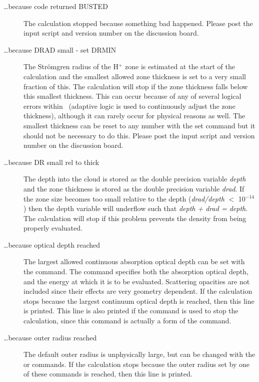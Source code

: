 \begin{description}
\item[\dots because code returned BUSTED]  The calculation stopped because
something bad happened.  Please post the input script and version number
on the discussion board.

\item[\dots because DRAD small -  set DRMIN]  The Str\"omgren radius of the
H$^+$
zone is estimated at the start of the calculation and the smallest allowed
zone thickness is set to a very small fraction of this.  The calculation
will stop if the zone thickness falls below this smallest thickness.  This
can occur because of any of several logical errors within \Cloudy\ (adaptive
logic is used to continuously adjust the zone thickness), although it can
rarely occur for physical reasons as well.  The smallest thickness can be
reset to any number with the set  command but it should not be necessary
to do this.  Please post the input script and version number on the
discussion board.

\item[\dots because DR small rel to thick]  The depth into the cloud is stored
as the double precision variable \emph{depth} and the zone thickness is stored
as the double precision variable \emph{drad}.  If the zone size becomes too small
relative to the depth (\emph{drad/depth} $<$ 10$^{-14}$) then the depth variable will
underflow such that \emph{depth + drad = depth}.  The calculation will stop if
this problem prevents the density from being properly evaluated.

\item[\dots because optical depth reached]  The largest allowed continuous
absorption optical depth can be set with the  command.
The command specifies both the absorption optical depth, and the energy
at which it is to be evaluated.  Scattering opacities are not included since
their effects are very geometry dependent.  If the calculation stops because
the largest continuum optical depth is reached, then this line is printed.
This line is also printed if the  command is
used to stop the calculation, since this command is actually a form of the
 command.

\item[\dots because outer radius reached]  The default outer radius is
unphysically large, but can be changed with the  or
commands.  If the calculation stops because the outer radius set by one
of these commands is reached, then this line is printed.


\end{description}

